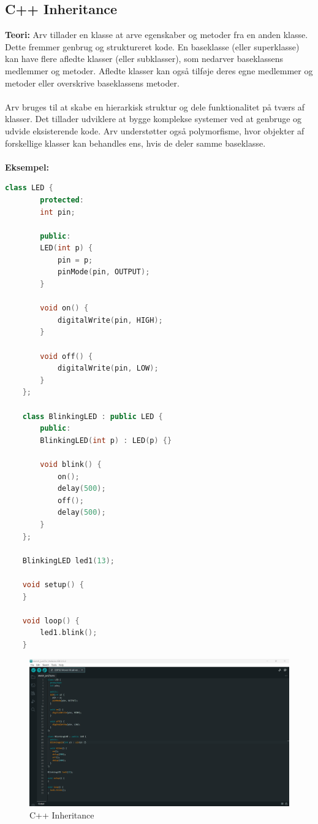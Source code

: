 \subsection{C++ Inheritance}
\textbf{Teori:} Arv tillader en klasse at arve egenskaber og metoder fra en anden klasse. Dette fremmer genbrug og struktureret kode. En baseklasse (eller superklasse) kan have flere afledte klasser (eller subklasser), som nedarver baseklassens medlemmer og metoder. Afledte klasser kan også tilføje deres egne medlemmer og metoder eller overskrive baseklassens metoder.
\\\\
\noindent Arv bruges til at skabe en hierarkisk struktur og dele funktionalitet på tværs af klasser. Det tillader udviklere at bygge komplekse systemer ved at genbruge og udvide eksisterende kode. Arv understøtter også polymorfisme, hvor objekter af forskellige klasser kan behandles ens, hvis de deler samme baseklasse.
\\\\
\noindent\textbf{Eksempel:}
\begin{lstlisting}[language=C++]
	class LED {
		protected:
		int pin;
		
		public:
		LED(int p) {
			pin = p;
			pinMode(pin, OUTPUT);
		}
		
		void on() {
			digitalWrite(pin, HIGH);
		}
		
		void off() {
			digitalWrite(pin, LOW);
		}
	};
	
	class BlinkingLED : public LED {
		public:
		BlinkingLED(int p) : LED(p) {}
		
		void blink() {
			on();
			delay(500);
			off();
			delay(500);
		}
	};
	
	BlinkingLED led1(13);
	
	void setup() {
	}
	
	void loop() {
		led1.blink();
	}
\end{lstlisting}
\begin{figure}[h!]
	\centering
	\includegraphics[width=\textwidth]{fig/fig14.png}
	\caption{C++ Inheritance}
	\label{fig:14}
\end{figure}

